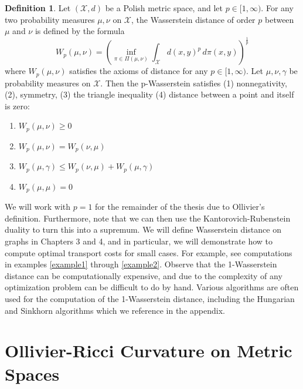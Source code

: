\documentclass{Dissertate}
\theoremstyle{definition}
\theoremstyle{definition} %
\theoremstyle{definition}
\newtheorem{definition}[theorem]{Definition}
\begin{document}
\begin{definition}
    Let $(\mathcal{X}, d)$ be a Polish metric space, and let $p \in [1, \infty)$. For any two probability measures $\mu, \nu$ on $\mathcal{X}$, the Wasserstein distance of order $p$ between $\mu$ and $\nu$ is defined by the formula
\begin{equation}
W_p(\mu, \nu) = \left( \inf_{\pi \in \Pi(\mu, \nu)} \int_{\mathcal{X}} d(x, y)^p \, d\pi(x, y) \right)^{\frac{1}{p}} 
\end{equation}
where $W_p(\mu, \nu)$ satisfies the axioms of distance for any $p \in [1, \infty)$. Let $\mu, \nu, \gamma$ be probability measures on $\mathcal{X}$. Then the p-Wasserstein satisfies (1) nonnegativity, (2), symmetry, (3) the triangle inequality (4) distance between a point and itself is zero:
\begin{enumerate}
    \item  $W_p(\mu, \nu) \geq 0$
    \item  $W_p(\mu, \nu) = W_p(\nu, \mu)$
    \item  $W_p(\mu, \gamma) \leq W_p(\nu, \mu) + W_p(\mu, \gamma)$
    \item $W_p(\mu, \mu) = 0$
\end{enumerate}

\end{definition}

We will work with $p = 1$ for the remainder of the thesis due to Ollivier's definition. Furthermore, note that we can then use the Kantorovich-Rubenstein duality to turn this into a supremum. We will define Wasserstein distance on graphs in Chapters 3 and 4, and in particular, we will demonstrate how to compute optimal transport costs for small cases. For example, see computations in examples \ref{example1} through \ref{example2}. Observe that the 1-Wasserstein distance can be computationally expensive, and due to the complexity of any optimization problem can be difficult to do by hand. Various algorithms are often used for the computation of the 1-Wasserstein distance, including the Hungarian and Sinkhorn algorithms which we reference in the appendix. 



\chapter{Ollivier-Ricci Curvature on Metric Spaces}
\end{document}
